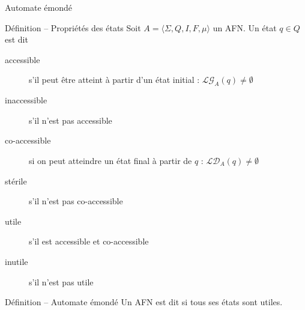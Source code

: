 
\begingroup

\begin{frame}{Automate émondé}
  \begin{block}{Définition -- Propriétés des états}
    Soit $A=\langle \Sigma, Q, I, F, \mu \rangle$ un AFN. Un état $q \in Q$ est dit
    \begin{description}
    \item[accessible] s'il peut être atteint à partir d'un état initial : \alert{$\mathcal{LG}_A(q) \neq \emptyset$}
    \item[inaccessible] s'il n'est pas accessible
    \item[co-accessible] si on peut atteindre un état final à partir de $q$ : \alert{$\mathcal{LD}_A(q) \neq \emptyset$}
    \item[stérile] s'il n'est pas co-accessible
    \item[utile] s'il est accessible et co-accessible
    \item[inutile] s'il n'est pas utile
    \end{description}
  \end{block}
  \begin{block}{Définition -- Automate émondé}
    Un AFN est dit  si tous ses états sont utiles. 
  \end{block}
\end{frame}


\endgroup
